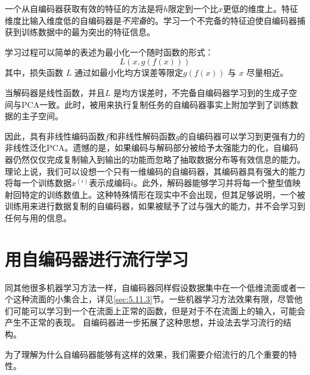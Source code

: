 一个从自编码器获取有效的特征的方法是将$h$限定到一个比$x$更低的维度上。特征维度比输入维度低的自编码器是\emph{不完备}的。学习一个不完备的特征迫使自编码器捕获到训练数据中的最为突出的特征信息。

学习过程可以简单的表述为最小化一个随时函数的形式：
\begin{equation}
	L(x,g(f(x)))
\end{equation}
其中，损失函数 $L$ 通过如最小化均方误差等限定$g(f(x))$ 与 $x$ 尽量相近。 

当解码器是线性函数，并且$L$ 是均方误差时，不完备自编码器学习到的生成子空间与PCA一致。此时，被用来执行复制任务的自编码器事实上附加学到了训练数据的主子空间。

因此，具有非线性编码函数$f$和非线性解码函数$g$的自编码器可以学习到更强有力的非线性泛化PCA。遗憾的是，如果编码与解码部分被给予太强能力的化，自编码器仍然仅仅完成复制输入到输出的功能而忽略了抽取数据分布等有效信息的能力。理论上说，我们可以设想一个只有一维编码的自编码器，其编码器具有强大的能力将每一个训练数据$x^{(i)}$表示成编码$i$。此外，解码器能够学习并将每一个整型值映射回特定的训练数值上。这种特殊情形在现实中不会出现，但其足够说明，一个被训练用来进行数据复制的自编码器，如果被赋予了过与强大的能力，并不会学习到任何与用的信息。


\section{用自编码器进行流行学习}
\label{sec:14.6}

同其他很多机器学习方法一样，自编码器同样假设数据集中在一个低维流面或者一个这种流面的小集合上，详见\ref{sec:5.11.3}节。一些机器学习方法效果有限，尽管他们可能可以学习到一个在流面上正常的函数，但是对于不在流面上的输入，可能会产生不正常的表现。
自编码器进一步拓展了这种思想，并设法去学习流行的结构。

为了理解为什么自编码器能够有这样的效果，我们需要介绍流行的几个重要的特性。

